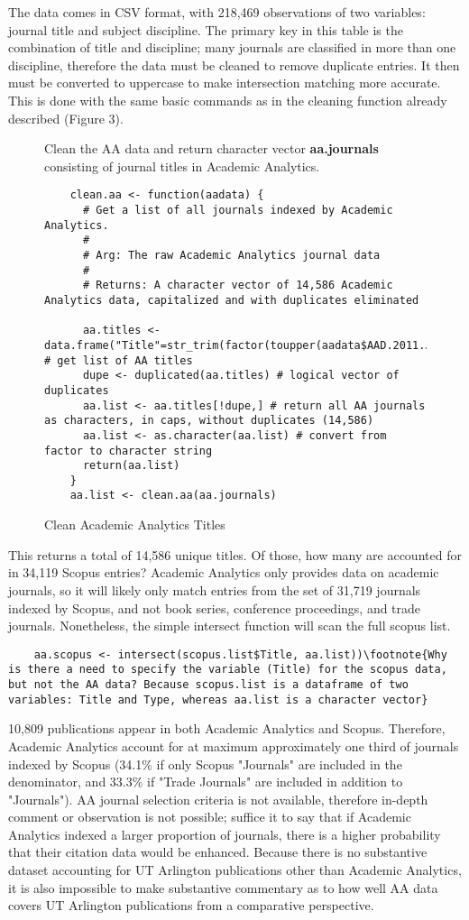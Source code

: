 \documentclass{article}
\begin{document}
The data comes in CSV format, with 218,469 observations of two variables: journal title and subject discipline.
The primary key in this table is the combination of title and discipline; many journals are classified in more than one discipline, therefore the data must be cleaned to remove duplicate entries. 
It then must be converted to uppercase to make intersection matching more accurate.
This is done with the same basic commands as in the cleaning function already described  (Figure 3).
\begin{figure}[htp]
	\centering
	\caption{Clean Academic Analytics Titles}
	\footnotesize{
		Clean the AA data and return character vector \textbf{aa.journals} consisting of journal titles in Academic Analytics. 
			}
	\begin{lstlisting}
	clean.aa <- function(aadata) {
	  # Get a list of all journals indexed by Academic Analytics. 
	  # 
	  # Arg: The raw Academic Analytics journal data
	  # 
	  # Returns: A character vector of 14,586 Academic Analytics data, capitalized and with duplicates eliminated
	  
	  aa.titles <- data.frame("Title"=str_trim(factor(toupper(aadata$AAD.2011.Journal.List)))) # get list of AA titles
	  dupe <- duplicated(aa.titles) # logical vector of duplicates
	  aa.list <- aa.titles[!dupe,] # return all AA journals as characters, in caps, without duplicates (14,586)
	  aa.list <- as.character(aa.list) # convert from factor to character string
	  return(aa.list)
	}
	aa.list <- clean.aa(aa.journals)
	\end{lstlisting}
\end{figure}

This returns a total of 14,586 unique titles.
Of those, how many are accounted for in 34,119 Scopus entries?
Academic Analytics only provides data on academic journals, so it will likely only match entries from the set of 31,719 journals indexed by Scopus, and not book series, conference proceedings, and trade journals.
Nonetheless, the simple intersect function will scan the full scopus list.
\begin{lstlisting}
	aa.scopus <- intersect(scopus.list$Title, aa.list))\footnote{Why is there a need to specify the variable (Title) for the scopus data, but not the AA data? Because scopus.list is a dataframe of two variables: Title and Type, whereas aa.list is a character vector}
\end{lstlisting}

10,809 publications appear in both Academic Analytics and Scopus. 
Therefore, Academic Analytics account for at maximum approximately one third of journals indexed by Scopus (34.1\% if only Scopus "Journals" are included in the denominator, and 33.3\% if "Trade Journals" are included in addition to "Journals").
AA journal selection criteria is not available, therefore in-depth comment or observation is not possible; suffice it to say that if Academic Analytics indexed a larger proportion of journals, there is a higher probability that their citation data would be enhanced.
Because there is no substantive dataset accounting for UT Arlington publications other than Academic Analytics, it is also impossible to make substantive commentary as to how well AA data covers UT Arlington publications from a comparative perspective.
\end{document}
